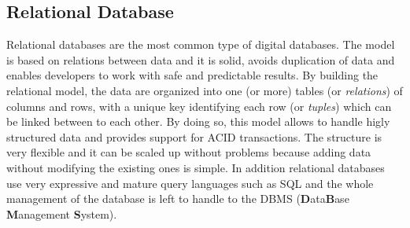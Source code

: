     \subsection{Relational Database}
    Relational databases are the most common type of digital databases. The
    model is based on relations between data and it is solid, avoids duplication
    of data and enables developers to work with safe and predictable results. By
    building the relational model, the data are organized into one (or more)
    tables (or \emph{relations}) of columns and rows, with a unique key
    identifying each row (or \emph{tuples}) which can be linked between to each
    other. By doing so, this model allows to handle higly structured data and
    provides support for ACID transactions. The structure is very flexible and
    it can be scaled up without problems because adding data without modifying
    the existing ones is simple. In addition relational databases use very
    expressive and mature query languages such as SQL and the whole management
    of the database is left to handle to the DBMS (\textbf{D}ata\textbf{B}ase
    \textbf{M}anagement \textbf{S}ystem).
     